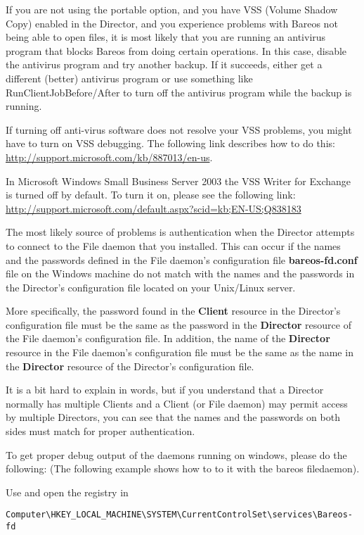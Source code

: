If you are not using the portable option, and you have VSS
(Volume Shadow Copy) enabled in the Director, and you experience
problems with Bareos not being able to open files, it is most
likely that you are running an antivirus program that blocks
Bareos from doing certain operations. In this case, disable the
antivirus program and try another backup.  If it succeeds, either
get a different (better) antivirus program or use something like
RunClientJobBefore/After to turn off the antivirus program while
the backup is running.

If turning off anti-virus software does not resolve your VSS
problems, you might have to turn on VSS debugging.  The following
link describes how to do this:
\url{http://support.microsoft.com/kb/887013/en-us}.

In Microsoft Windows Small Business Server 2003 the VSS Writer for Exchange
is turned off by default. To turn it on, please see the following link:
\url{http://support.microsoft.com/default.aspx?scid=kb;EN-US;Q838183}


The most likely source of problems is authentication when the Director
attempts to connect to the File daemon that you installed. This can occur if
the names and the passwords defined in the File daemon's configuration file
{\bf bareos-fd.conf} file on
the Windows machine do not match with the names and the passwords in the
Director's configuration file  located on your Unix/Linux
server.

More specifically, the password found in the {\bf Client} resource in the
Director's configuration file must be the same as the password in the {\bf
Director} resource of the File daemon's configuration file. In addition, the
name of the {\bf Director} resource in the File daemon's configuration file
must be the same as the name in the {\bf Director} resource of the Director's
configuration file.

It is a bit hard to explain in words, but if you understand that a Director
normally has multiple Clients and a Client (or File daemon) may permit access
by multiple Directors, you can see that the names and the passwords on both
sides must match for proper authentication.


To get proper debug output of the daemons running on windows, please do the following:
(The following example shows how to to it with the bareos filedaemon).

Use  and open the registry in
{
\footnotesize
\begin{verbatim}
Computer\HKEY_LOCAL_MACHINE\SYSTEM\CurrentControlSet\services\Bareos-fd
\end{verbatim}
}

